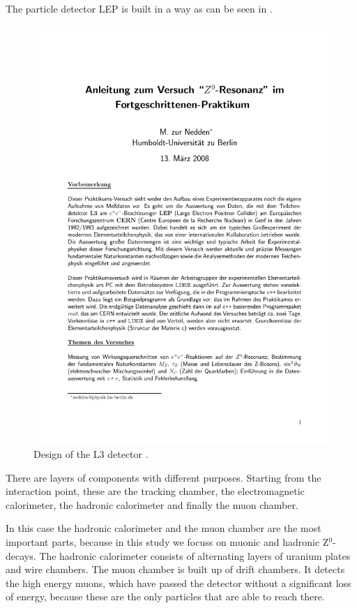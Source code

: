 \documentclass[epj,nopacs]{svjour}
\begin{document}
The particle detector LEP is built in a way as can be seen in .
\begin{figure}[htb]
 \centering
 \includegraphics[page=5,viewport=286 620 508 765,clip,%
  width=\columnwidth,keepaspectratio]{../../Z0/docs/Z0ResFprakt}
 \caption{Design of the L3 detector \cite{pic}.}
 \label{fig:aufbau}
\end{figure}
There are layers of components with different purposes. Starting from the
interaction point, these are the tracking chamber, the electromagnetic
calorimeter, the hadronic calorimeter and finally the muon chamber.

In this case the hadronic calorimeter and the muon chamber are the most
important parts, because in this study we focuss on muonic and hadronic
Z$^0$-decays. The hadronic calorimeter consists of alternating layers of
uranium plates and wire chambers. The muon chamber is built up of drift
chambers. It detects the high energy muons, which have passed the detector
without a significant loss of energy, because these are the only particles that
are able to reach there.
\end{document}
